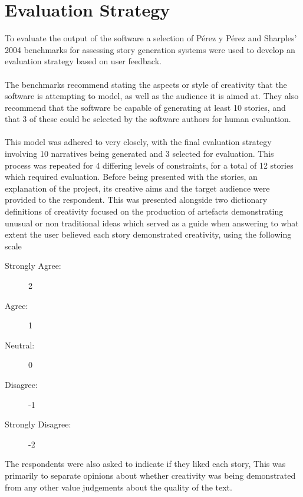 \documentclass[letterpaper]{article}
\begin{document}
\section{Evaluation Strategy}
To evaluate the output of the software a selection of P\'erez y P\'erez and Sharples' 2004 benchmarks for assessing story generation systems were used to develop an evaluation strategy based on user feedback.\\
\\The benchmarks recommend stating the aspects or style of creativity that the software is attempting to model, as well as the audience it is aimed at. They also recommend that the software be capable of generating at least 10 stories, and that 3 of these could be selected by the software authors for human evaluation.\\ 
\\This model was adhered to very closely, with the final evaluation strategy involving 10 narratives being generated and 3 selected for evaluation. This process was repeated for 4 differing levels of constraints, for a total of 12 stories which required evaluation. Before being presented with the stories, an explanation of the project, its creative aims and the target audience were provided to the respondent. This was presented alongside two dictionary definitions of creativity focused on the production of artefacts demonstrating unusual or non traditional ideas which served as a guide when answering to what extent the user believed each story demonstrated creativity, using the following scale
\begin{description}
\item[Strongly Agree:] 2
\item[Agree:] 1
\item[Neutral:] 0
\item[Disagree:] -1
\item[Strongly Disagree:] -2
\end{description} 
The respondents were also asked to indicate if they liked each story, This was primarily to separate opinions about whether creativity was being demonstrated from any other value judgements about the quality of the text.
\end{document}
